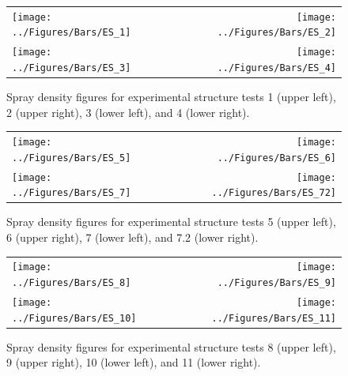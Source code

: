 \documentclass[12pt,oneside]{book}
\begin{document}
\clearpage

\begin{figure}[ht]
\begin{tabular*}{\textwidth}{lr}
\texttt{[image: ../Figures/Bars/ES\_1]} &
\texttt{[image: ../Figures/Bars/ES\_2]} \\
\texttt{[image: ../Figures/Bars/ES\_3]} &
\texttt{[image: ../Figures/Bars/ES\_4]}
\end{tabular*}
\caption{Spray density figures for experimental structure tests 1 (upper left), 2 (upper right), 3 (lower left), and 4 (lower right).}
\label{fig:es_1_4}
\end{figure}

\clearpage

\begin{figure}[ht]
\begin{tabular*}{\textwidth}{lr}
\texttt{[image: ../Figures/Bars/ES\_5]} &
\texttt{[image: ../Figures/Bars/ES\_6]} \\
\texttt{[image: ../Figures/Bars/ES\_7]} &
\texttt{[image: ../Figures/Bars/ES\_72]}
\end{tabular*}
\caption{Spray density figures for experimental structure tests 5 (upper left), 6 (upper right), 7 (lower left), and 7.2 (lower right).}
\label{fig:es_5_72}
\end{figure}

\clearpage

\begin{figure}[ht]
\begin{tabular*}{\textwidth}{lr}
\texttt{[image: ../Figures/Bars/ES\_8]} &
\texttt{[image: ../Figures/Bars/ES\_9]} \\
\texttt{[image: ../Figures/Bars/ES\_10]} &
\texttt{[image: ../Figures/Bars/ES\_11]}
\end{tabular*}
\caption{Spray density figures for experimental structure tests 8 (upper left), 9 (upper right), 10 (lower left), and 11 (lower right).}
\label{fig:es_8_11}
\end{figure}
\end{document}
